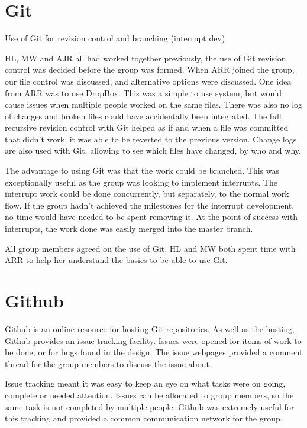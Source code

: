 

\section{Git}
Use of Git for revision control and branching (interrupt dev)

HL, MW and AJR all had worked together previously, the use of Git revision control was decided before the group was formed. 
When ARR joined the group, our file control was discussed, and alternative options were discussed. 
One idea from ARR was to use DropBox. 
This was a simple to use system, but would cause issues when multiple people worked on the same files. 
There was also no log of changes and broken files could have accidentally been integrated. 
The full recursive revision control with Git helped as if and when a file was committed that didn't work, it was able to be reverted to the previous version.
Change logs are also used with Git, allowing to see which files have changed, by who and why. 


The advantage to using Git was that the work could be branched.
This was exceptionally useful as the group was looking to implement interrupts.
The interrupt work could be done concurrently, but separately, to the normal work flow. 
If the group hadn't achieved the milestones for the interrupt development, no time would have needed to be spent removing it.
At the point of success with interrupts, the work done was easily merged into the master branch. 

All group members agreed on the use of Git. 
HL and MW both spent time with ARR to help her understand the basics to be able to use Git.


\section{Github}
Github is an online resource for hosting Git repositories. 
As well as the hosting, Github provides an issue tracking facility.
Issues were opened for items of work to be done, or for bugs found in the design.
The issue webpages provided a comment thread for the group members to discuss the issue about. 

Issue tracking meant it was easy to keep an eye on what tasks were on going, complete or needed attention. 
Issues can be allocated to group members, so the same task is not completed by multiple people. 
Github was extremely useful for this tracking and provided a common communication network for the group. 


